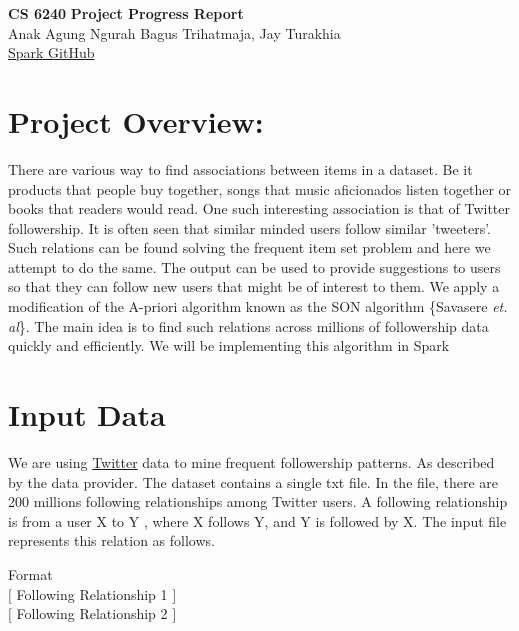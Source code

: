 \documentclass[11pt]{article}
\begin{document}
    \thispagestyle{empty}
    \setlength{\parindent}{0pt}
    \setlength{\parskip}{1.8ex}
    \lstset{language=Scala}
    \newcommand{\hs}{\hspace{.1in}}

    \begin{center}
        \Large{\bf CS 6240}
        \Large{\bf Project Progress Report\\}
        \Large{Anak Agung Ngurah Bagus Trihatmaja, Jay Turakhia\\}
        \href{https://github.ccs.neu.edu/prdx/CS6240-Project}{Spark GitHub}  \\
    \end{center}
    \medskip

\section{Project Overview: }
There are various way to find associations between items in a dataset.
Be it products that people buy together, songs that music aficionados listen together or books that readers would read.
One such interesting association is that of Twitter followership.
It is often seen that similar minded users follow similar 'tweeters'.\\
Such relations can be found solving the frequent item set problem and here we attempt to do the same.
The output can be used to provide suggestions to users so that they can follow new users that might be of interest to them.
We apply a modification of the A-priori algorithm known as the SON algorithm \{Savasere \textit  {et. al}\}.
The main idea is to find such relations across millions of followership data quickly and efficiently.
We will be implementing this algorithm in Spark\\

\section{Input Data}
We are using \href{https://wiki.illinois.edu//wiki/display/forward/Dataset-UDI-TwitterCrawl-Aug2012}{Twitter} data to mine frequent followership patterns.
As described by the data provider.
The dataset contains a single txt file.
In the file, there are 200 millions following relationships among Twitter users.
A following relationship is from a user X to Y , where X follows Y, and Y is followed by X.
The input file represents this relation as follows.

Format\\
$\big[$ Following Relationship 1 $\big]$\\
$\big[$ Following Relationship 2 $\big]$\\
\end{document}
